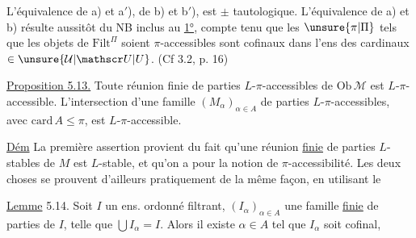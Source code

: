 
L'équivalence de a) et a$'$),  de b) et b$'$), est $\pm$ tautologique. L'équivalence de a) et b) résulte aussitôt du NB inclus au \uline{1°}, compte tenu que les $\unsure{\pi|\Pi}$ tels que les objets de $\mathrm{Filt}^{\Pi}$ soient $\pi$-accessibles sont cofinaux dans l'ens des cardinaux $\in\unsure{\mathcal U|\mathscr U|U}$. (Cf 3.2, p. 16)

\margin{\rule{0.4pt}{3cm}}\uline{Proposition 5.13.} Toute réunion finie de parties $L$-$\pi$-accessibles de $\mathrm{Ob}\,\mathcal M$ est $L$-$\pi$-accessible. L'intersection d'une famille $(M_\alpha)_{\alpha\in A}$ de parties $L$-$\pi$-accessibles, avec $\mathrm{card}\,A\leq\pi$, est $L$-$\pi$-accessible.

\uline{Dém} La première assertion provient du fait qu'une réunion \uline{finie} de parties $L$-stables de $M$ est $L$-stable,  et qu'on a  pour la notion de $\pi$-accessibilité. Les deux choses se prouvent d'ailleurs pratiquement de la même façon, en utilisant le

\uline{Lemme} 5.14. Soit $I$ un ens. ordonné filtrant, $(I_\alpha)_{\alpha\in A}$ une famille \uline{finie}  de parties de $I$, telle que $\bigcup I_\alpha=I$. Alors il existe $\alpha\in A$ tel que $I_\alpha$ soit cofinal, 

